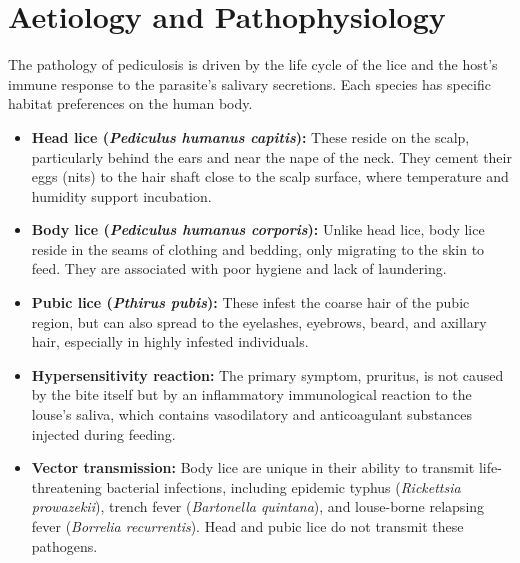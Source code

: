 \section*{Aetiology and Pathophysiology}
The pathology of pediculosis is driven by the life cycle of the lice and the host's immune response to the parasite's salivary secretions. Each species has specific habitat preferences on the human body.
\begin{itemize}
    \item \textbf{Head lice (\textit{Pediculus humanus capitis}):} These reside on the scalp, particularly behind the ears and near the nape of the neck. They cement their eggs (nits) to the hair shaft close to the scalp surface, where temperature and humidity support incubation.
    \item \textbf{Body lice (\textit{Pediculus humanus corporis}):} Unlike head lice, body lice reside in the seams of clothing and bedding, only migrating to the skin to feed. They are associated with poor hygiene and lack of laundering.
    \item \textbf{Pubic lice (\textit{Pthirus pubis}):} These infest the coarse hair of the pubic region, but can also spread to the eyelashes, eyebrows, beard, and axillary hair, especially in highly infested individuals.
    \item \textbf{Hypersensitivity reaction:} The primary symptom, pruritus, is not caused by the bite itself but by an inflammatory immunological reaction to the louse's saliva, which contains vasodilatory and anticoagulant substances injected during feeding.
    \item \textbf{Vector transmission:} Body lice are unique in their ability to transmit life-threatening bacterial infections, including epidemic typhus (\textit{Rickettsia prowazekii}), trench fever (\textit{Bartonella quintana}), and louse-borne relapsing fever (\textit{Borrelia recurrentis}). Head and pubic lice do not transmit these pathogens.
\end{itemize}


